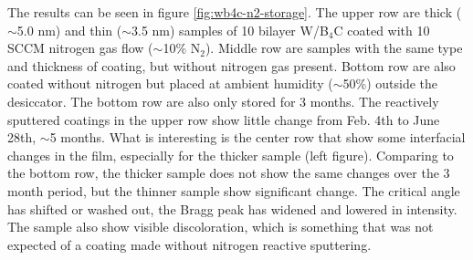 The results can be seen in figure \ref{fig:wb4c-n2-storage}. The upper row are thick ($\sim$5.0 nm) and thin ($\sim$3.5 nm) samples of 10 bilayer W/B$_4$C coated with 10 SCCM nitrogen gas flow ($\sim$10\% N$_2$). Middle row are samples with the same type and thickness of coating, but without nitrogen gas present. Bottom row are also coated without nitrogen but placed at ambient humidity ($\sim$50\%) outside the desiccator. The bottom row are also only stored for 3 months. The reactively sputtered coatings in the upper row show little change from Feb. 4th to June 28th, $\sim$5 months. What is interesting is the center row that show some interfacial changes in the film, especially for the thicker sample (left figure). Comparing to the bottom row, the thicker sample does not show the same changes over the 3 month period, but the thinner sample show significant change. The critical angle has shifted or washed out, the Bragg peak has widened and lowered in intensity. The sample also show visible discoloration, which is something that was not expected of a coating made without nitrogen reactive sputtering.


